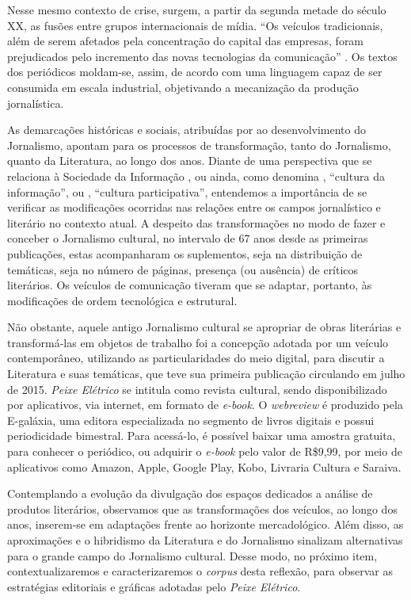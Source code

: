 \documentclass[portuguese]{textolivre}
\begin{document}
Nesse mesmo contexto de crise, surgem, a partir da segunda metade do século XX, as fusões entre grupos internacionais de mídia. “Os veículos tradicionais, além de serem afetados pela concentração do capital das empresas, foram prejudicados pelo incremento das novas tecnologias da comunicação” \cite[p. 28]{lima2013}. Os textos dos periódicos moldam-se, assim, de acordo com uma linguagem capaz de ser consumida em escala industrial, objetivando a mecanização da produção jornalística.

As demarcações históricas e sociais, atribuídas por \textcite{lima2013,marcondes2002} ao desenvolvimento do Jornalismo, apontam para os processos de transformação, tanto do Jornalismo, quanto da Literatura, ao longo dos anos. Diante de uma perspectiva que se relaciona à Sociedade da Informação \cite{castells2001}, ou ainda, como denomina \textcite{jenkins2008convergence}, “cultura da informação”, ou \textcite{shirky2011}, “cultura participativa”, entendemos a importância de se verificar as modificações ocorridas nas relações entre os campos jornalístico e literário no contexto atual. A despeito das transformações no modo de fazer e conceber o Jornalismo cultural, no intervalo de 67 anos desde as primeiras publicações, estas acompanharam os suplementos, seja na distribuição de temáticas, seja no número de páginas, presença (ou ausência) de críticos literários. Os veículos de comunicação tiveram que se adaptar, portanto, às modificações de ordem tecnológica e estrutural.

Não obstante, aquele antigo Jornalismo cultural se apropriar de obras literárias e transformá-las em objetos de trabalho foi a concepção adotada por um veículo contemporâneo, utilizando as particularidades do meio digital, para discutir a Literatura e suas temáticas, que teve sua primeira publicação circulando em julho de 2015. \textit{Peixe Elétrico} se intitula como revista cultural, sendo disponibilizado por aplicativos, via internet, em formato de \textit{e-book}. O \textit{webreview} é produzido pela E-galáxia, uma editora especializada no segmento de livros digitais e possui periodicidade bimestral. Para acessá-lo, é possível baixar uma amostra gratuita, para conhecer o periódico, ou adquirir o \textit{e-book} pelo valor de R\$9,99, por meio de aplicativos como Amazon, Apple, Google Play, Kobo, Livraria Cultura e Saraiva.

Contemplando a evolução da divulgação dos espaços dedicados a análise de produtos literários, observamos que as transformações dos veículos, ao longo dos anos, inserem-se em adaptações frente ao horizonte mercadológico. Além disso, as aproximações e o hibridismo da Literatura e do Jornalismo sinalizam alternativas para o grande campo do Jornalismo cultural. Desse modo, no próximo item, contextualizaremos e caracterizaremos o \textit{corpus} desta reflexão, para observar as estratégias editoriais e gráficas adotadas pelo \textit{Peixe Elétrico}.
\end{document}
